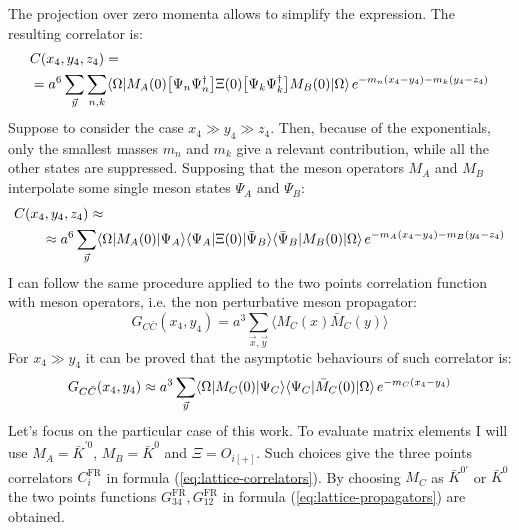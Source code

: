 \documentclass[english, LaM, oneside, noexaminfo]{sapthesis}
\newcommand{\la}{\langle}
\newcommand{\ra}{\rangle}
\begin{document}
The projection over zero momenta allows to simplify the expression.
The resulting correlator is:
\begin{equation*}
    \begin{split}
        & C(x_4,y_4,z_4) = \\
        & = a^6\sum_{\vec y}\sum_{n,k} \la \Omega | M_A (0) \big[\Psi_n \Psi_n^\dag \big] \Xi (0) \big[\Psi_k \Psi_k^\dag \big] M_B (0) | \Omega \ra \hspace*{0.5mm} e^{-m_n(x_4-y_4)-m_k(y_4-z_4)}
    \end{split}
\end{equation*}
Suppose to consider the case $x_4 \gg y_4 \gg z_4$.
Then, because of the exponentials, only the smallest masses $m_n$ and $m_k$ give a relevant contribution, while all the other states are suppressed.
Supposing that the meson operators $M_A$ and $M_B$ interpolate some single meson states $\Psi_A$ and $\Psi_B$:
\begin{equation}\label{eq:asymptotic-behav-3pts}
    \begin{split}
        & C(x_4,y_4,z_4)\approx \\
        & \qquad \approx  a^6\sum_{\vec y} \la \Omega | M_A(0) | \Psi_A \ra \la \Psi_A | \Xi (0) | \bar\Psi_B \ra \la \bar\Psi_B | M_B (0) | \Omega \ra \hspace*{.5mm} e^{-m_A(x_4-y_4)-m_B(y_4-z_4)}
    \end{split}
\end{equation}
I can follow the same procedure applied to the two points correlation function with meson operators, i.e. the non perturbative meson propagator:
\begin{equation}\label{eq:2pts-correlator-meson}
    G_{C\bar C}(x_4,y_4) = a^3 \sum_{\vec x, \vec y} \la M_C (x) \bar M_C (y) \ra
\end{equation}
For $x_4 \gg y_4$ it can be proved that the asymptotic behaviours of such correlator is:
\begin{equation}\label{eq:asymptotic-behav-2pts}
    G_{C\bar C}(x_4,y_4) \approx a^3 \sum_{\vec y} \la \Omega | M_C (0) | \Psi_C \ra \la \Psi_C | \bar M_C (0) | \Omega \ra \hspace*{0.5mm} e^{-m_C(x_4-y_4)}
\end{equation}
Let's focus on the particular case of this work.
To evaluate matrix elements I will use $M_A = \bar K^{'0}$, $M_B = \bar K^0$ and $\Xi = O_{i[+]}$.
Such choices give the three points correlators $C_i^\text{FR}$ in formula (\ref{eq:lattice-correlators}).
By choosing $M_C$ as $\bar K^{0'}$ or $\bar K^{0}$ the two points functions $G_{34}^\text{FR}, G_{12}^\text{FR}$ in formula (\ref{eq:lattice-propagators}) are obtained.
\end{document}
